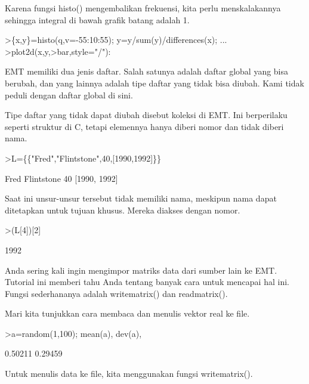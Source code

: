 \documentclass[a4paper,10pt]{article}
\begin{document}
\begin{eulernotebook}
\begin{eulercomment}
\begin{eulercomment}
\begin{eulercomment}
\begin{eulercomment}
\begin{eulercomment}
\begin{eulercomment}
\begin{eulercomment}
Karena fungsi histo() mengembalikan frekuensi, kita perlu
menskalakannya sehingga integral di bawah grafik batang adalah 1.
\end{eulercomment}
\begin{eulerprompt}
>\{x,y\}=histo(q,v=-55:10:55); y=y/sum(y)/differences(x); ...
>plot2d(x,y,>bar,style="/"):
\end{eulerprompt}
\begin{eulercomment}
EMT memiliki dua jenis daftar. Salah satunya adalah daftar global yang
bisa berubah, dan yang lainnya adalah tipe daftar yang tidak bisa
diubah. Kami tidak peduli dengan daftar global di sini.

Tipe daftar yang tidak dapat diubah disebut koleksi di EMT. Ini
berperilaku seperti struktur di C, tetapi elemennya hanya diberi nomor
dan tidak diberi nama.
\end{eulercomment}
\begin{eulerprompt}
>L=\{\{"Fred","Flintstone",40,[1990,1992]\}\}
\end{eulerprompt}
\begin{euleroutput}
  Fred
  Flintstone
  40
  [1990,  1992]
\end{euleroutput}
\begin{eulercomment}
Saat ini unsur-unsur tersebut tidak memiliki nama, meskipun nama dapat
ditetapkan untuk tujuan khusus. Mereka diakses dengan nomor.
\end{eulercomment}
\begin{eulerprompt}
>(L[4])[2]
\end{eulerprompt}
\begin{euleroutput}
  1992
\end{euleroutput}
\begin{eulercomment}
\begin{eulercomment}
\begin{eulercomment}
Anda sering kali ingin mengimpor matriks data dari sumber lain ke EMT.
Tutorial ini memberi tahu Anda tentang banyak cara untuk mencapai hal
ini. Fungsi sederhananya adalah writematrix() dan readmatrix().

Mari kita tunjukkan cara membaca dan menulis vektor real ke file.
\end{eulercomment}
\begin{eulerprompt}
>a=random(1,100); mean(a), dev(a),
\end{eulerprompt}
\begin{euleroutput}
  0.50211
  0.29459
\end{euleroutput}
\begin{eulercomment}
Untuk menulis data ke file, kita menggunakan fungsi writematrix().


\end{eulercomment}
\end{eulercomment}
\end{eulercomment}
\end{eulercomment}
\end{eulercomment}
\end{eulercomment}
\end{eulercomment}
\end{eulercomment}
\end{eulercomment}
\end{eulernotebook}
\end{document}
